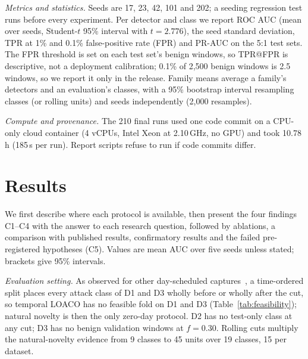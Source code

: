 \documentclass[conference]{IEEEtran}
\begin{document}
\emph{Metrics and statistics.} Seeds are 17, 23, 42, 101 and 202; a seeding regression test runs before every experiment. Per detector and class we report ROC AUC (mean over seeds, Student-$t$ 95\% interval with $t{=}2.776$), the seed standard deviation, TPR at 1\% and 0.1\% false-positive rate (FPR) and PR-AUC on the 5:1 test sets. The FPR threshold is set on each test set's benign windows, so TPR@FPR is descriptive, not a deployment calibration; 0.1\% of 2,500 benign windows is 2.5 windows, so we report it only in the release. Family means average a family's detectors and an evaluation's classes, with a 95\% bootstrap interval resampling classes (or rolling units) and seeds independently (2,000 resamples).

\emph{Compute and provenance.} The 210 final runs used one code commit on a CPU-only cloud container (4 vCPUs, Intel Xeon at 2.10\,GHz, no GPU) and took 10.78\,h (185\,s per run). Report scripts refuse to run if code commits differ.

\section{Results}\label{sec:results}
We first describe where each protocol is available, then present the four findings C1--C4 with the answer to each research question, followed by ablations, a comparison with published results, confirmatory results and the failed pre-registered hypotheses (C5). Values are mean AUC over five seeds unless stated; brackets give 95\% intervals.


\emph{Evaluation setting.} As observed for other day-scheduled captures~\cite{moczkodan2026,abdessamad2026}, a time-ordered split places every attack class of D1 and D3 wholly before or wholly after the cut, so temporal LOACO has no feasible fold on D1 and D3 (Table~\ref{tab:feasibility}); natural novelty is then the only zero-day protocol. D2 has no test-only class at any cut; D3 has no benign validation windows at $f{=}0.30$. Rolling cuts multiply the natural-novelty evidence from 9 classes to 45 units over 19 classes, 15 per dataset.
\end{document}
